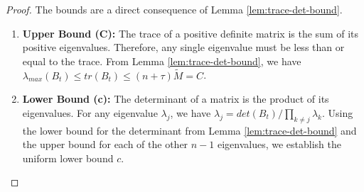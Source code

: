 \documentclass[a4paper,12pt]{article}
\begin{document}
\begin{proof}
The bounds are a direct consequence of Lemma \ref{lem:trace-det-bound}.
\begin{enumerate}
    \item \textbf{Upper Bound (C):} The trace of a positive definite matrix is the sum of its positive eigenvalues. Therefore, any single eigenvalue must be less than or equal to the trace. From Lemma \ref{lem:trace-det-bound}, we have $\lambda_{max}(B_t) \le tr(B_t) \le (n+\tau)\tilde{M} = C$.

    \item \textbf{Lower Bound (c):} The determinant of a matrix is the product of its eigenvalues. For any eigenvalue $\lambda_j$, we have $\lambda_j = det(B_t) / \prod_{k \ne j} \lambda_k$. Using the lower bound for the determinant from Lemma \ref{lem:trace-det-bound} and the upper bound for each of the other $n-1$ eigenvalues, we establish the uniform lower bound $c$.
\end{enumerate}
\end{proof}
\end{document}
